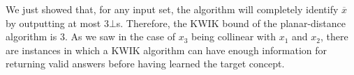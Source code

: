 We just showed that, for any input set, the algorithm will completely identify
$\overline{x}$ by outputting at most $3 \bot$s. Therefore, the KWIK bound of the
planar-distance algorithm is $3$. As we saw in the case of $x_3$ being collinear
with $x_1$ and $x_2$, there are instances in which a KWIK algorithm can
have enough information for returning valid answers before having learned the
target concept.


